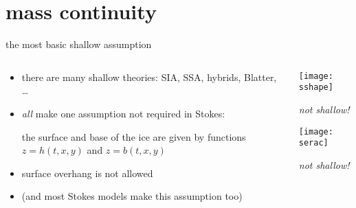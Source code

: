 
\section{mass continuity}

\begin{frame}{the most basic shallow assumption}

\begin{columns}

\begin{column}{0.6\textwidth}
\begin{itemize}
\item there are many shallow theories: SIA, SSA, hybrids, Blatter, \dots
\item \emph{all} make one assumption not required in Stokes:

\begin{center}
\alert{the surface and base of the ice are given by functions $z=h(t,x,y)$ and $z=b(t,x,y)$}
\end{center}
\item surface overhang is not allowed
\item (and most Stokes models make this assumption too)
\end{itemize}
\end{column}

\begin{column}{0.4\textwidth}
\texttt{[image: sshape]}

\scriptsize
\begin{center}
\emph{not shallow!}
\end{center}
\vspace{6mm}

\texttt{[image: serac]}

\begin{center}
\emph{not shallow!}
\end{center}
\end{column}
\end{columns}
\end{frame}


